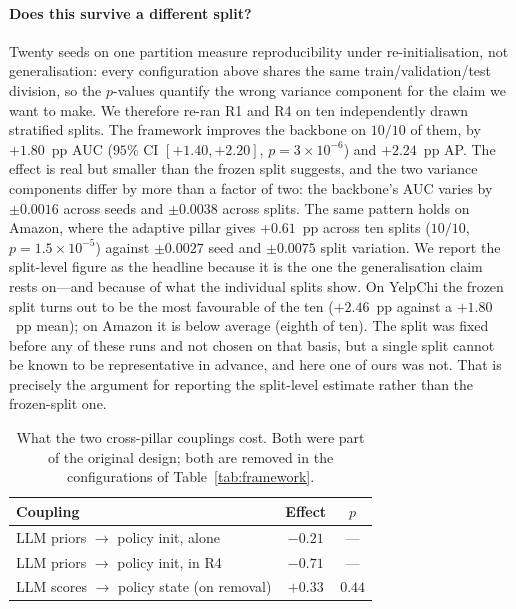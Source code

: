 \documentclass{conf}
\begin{document}
\paragraph{Does this survive a different split?} Twenty seeds on one partition
measure reproducibility under re-initialisation, not generalisation: every
configuration above shares the same train/validation/test division, so the
$p$-values quantify the wrong variance component for the claim we want to make.
We therefore re-ran R1 and R4 on ten independently drawn stratified splits.
The framework improves the backbone on $10/10$ of them, by $+1.80$~pp AUC
($95\%$ CI $[+1.40,+2.20]$, $p=3\times10^{-6}$) and $+2.24$~pp AP. The effect
is real but smaller than the frozen split suggests, and the two variance
components differ by more than a factor of two: the backbone's AUC varies by
$\pm 0.0016$ across seeds and $\pm 0.0038$ across splits. The same pattern
holds on Amazon, where the adaptive pillar gives $+0.61$~pp across ten splits
($10/10$, $p=1.5\times10^{-5}$) against $\pm 0.0027$ seed and $\pm 0.0075$
split variation. We report the split-level figure as the headline because it
is the one the generalisation claim rests on---and because of what the
individual splits show. On YelpChi the frozen split turns out to be the most
favourable of the ten ($+2.46$~pp against a $+1.80$~pp mean); on Amazon it is
below average (eighth of ten). The split was fixed before any of these runs and
not chosen on that basis, but a single split cannot be known to be
representative in advance, and here one of ours was not. That is precisely the
argument for reporting the split-level estimate rather than the frozen-split
one.

\begin{table}[H]
\centering
\footnotesize
\setlength{\tabcolsep}{4pt}
\caption{What the two cross-pillar couplings cost. Both were part of the
original design; both are removed in the configurations of
Table~\ref{tab:framework}.}
\label{tab:couplings}
\begin{tabularx}{\linewidth}{@{}Xcc@{}}
\toprule
Coupling & Effect & $p$ \\
\midrule
LLM priors $\rightarrow$ policy init, alone   & $-0.21$ & --- \\
LLM priors $\rightarrow$ policy init, in R4   & $-0.71$ & --- \\
LLM scores $\rightarrow$ policy state (on removal) & $+0.33$ & $0.44$ \\
\bottomrule
\end{tabularx}
\end{table}
\end{document}
